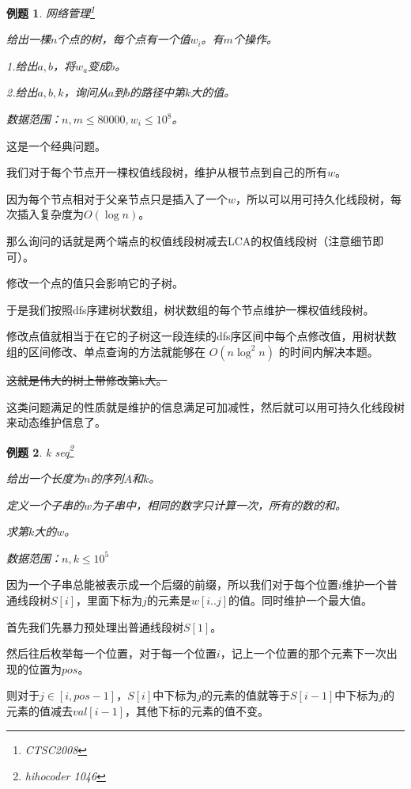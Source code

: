 \documentclass[a4paper]{article}
\newtheorem{problem}{例题}
\begin{document}
\begin{problem}
  网络管理\footnote{CTSC2008}

  给出一棵$n$个点的树，每个点有一个值$w_i$。有$m$个操作。

  1.给出$a,b$，将$w_a$变成$b$。

  2.给出$a,b,k$，询问从$a$到$b$的路径中第$k$大的值。

  数据范围：$n,m\leq 80000, w_i\leq 10^8$。
\end{problem}

这是一个经典问题。

我们对于每个节点开一棵权值线段树，维护从根节点到自己的所有$w$。

因为每个节点相对于父亲节点只是插入了一个$w$，所以可以用可持久化线段树，每次插入复杂度为$O(\log n)$。

那么询问的话就是两个端点的权值线段树减去LCA的权值线段树（注意细节即可）。

修改一个点的值只会影响它的子树。

于是我们按照dfs序建树状数组，树状数组的每个节点维护一棵权值线段树。

修改点值就相当于在它的子树这一段连续的dfs序区间中每个点修改值，用树状数组的区间修改、单点查询的方法就能够在 $O(n\log^2 n)$ 的时间内解决本题。

\sout{这就是伟大的树上带修改第k大。}

\bigskip

这类问题满足的性质就是维护的信息满足可加减性，然后就可以用可持久化线段树来动态维护信息了。

\begin{problem}
  k seq\footnote{hihocoder 1046}

  给出一个长度为$n$的序列$A$和$k$。

  定义一个子串的$w$为子串中，相同的数字只计算一次，所有的数的和。

  求第$k$大的$w$。

  数据范围：$n, k\leq 10^5$
\end{problem}

因为一个子串总能被表示成一个后缀的前缀，所以我们对于每个位置$i$维护一个普通线段树$S[i]$，里面下标为$j$的元素是$w[i..j]$的值。同时维护一个最大值。

首先我们先暴力预处理出普通线段树$S[1]$。

然后往后枚举每一个位置，对于每一个位置$i$，记上一个位置的那个元素下一次出现的位置为$pos$。

则对于$j\in [i, pos - 1]$，$S[i]$中下标为$j$的元素的值就等于$S[i-1]$中下标为$j$的元素的值减去$val[i-1]$，其他下标的元素的值不变。
\end{document}

